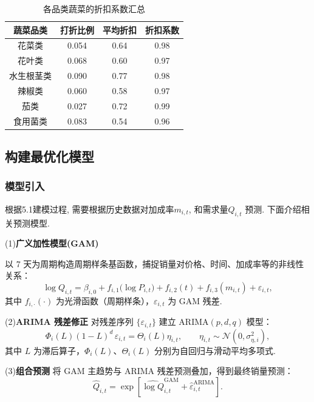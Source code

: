\documentclass{cumcmthesis}
\begin{document}
\begin{table}[H]
\centering
\begin{tabular}{cccc}
\hline
蔬菜品类 & 打折比例 & 平均折扣 & 折扣系数 \\
\hline
花菜类 & 0.054 & 0.64 &  0.98  \\
花叶类 & 0.068 & 0.60 &  0.97  \\
水生根茎类 & 0.090 & 0.77 & 0.98 \\
辣椒类 & 0.060 & 0.58 &  0.97 \\
茄类 & 0.027 & 0.72 &  0.99 \\
食用菌类 & 0.083 & 0.54 & 0.96  \\
\hline

\end{tabular}
\caption{各品类蔬菜的折扣系数汇总}
\label{tab:best_models}
\end{table}



\subsection{构建最优化模型}

\subsubsection{模型引入} 

根据5.1建模过程, 需要根据历史数据对加成率$m_{i,t}$, 和需求量$Q_{i,t}$
预测. 下面介绍相关预测模型.

(1)\textbf{广义加性模型(GAM)}

以 7 天为周期构造周期样条基函数，捕捉销量对价格、时间、加成率等的非线性关系：
\begin{equation}
\log Q_{i,t} = \beta_{i,0} 
+ f_{i,1}\bigl(\log P_{i,t}\bigr) 
+ f_{i,2}(t) 
+ f_{i,3}(m_{i,t}) 
+ \varepsilon_{i,t},
\label{eq:GAM}
\end{equation}
其中 $f_{i,\cdot}(\cdot)$ 为光滑函数（周期样条），$\varepsilon_{i,t}$ 为 GAM 残差.

(2)\textbf{ARIMA 残差修正}
对残差序列 $\{\varepsilon_{i,t}\}$ 建立 ARIMA$(p,d,q)$ 模型：
\begin{equation}
\Phi_i(L)(1-L)^d\,\varepsilon_{i,t} = \Theta_i(L)\eta_{i,t},
\qquad \eta_{i,t}\sim\mathcal{N}(0,\sigma_{\eta,i}^2),
\label{eq:ARIMA}
\end{equation}
其中 $L$ 为滞后算子，$\Phi_i(L)$、$\Theta_i(L)$ 分别为自回归与滑动平均多项式.

(3)\textbf{组合预测}
将 GAM 主趋势与 ARIMA 残差预测叠加，得到最终销量预测：
\begin{equation}
\widehat{Q}_{i,t} = \exp\!\left[\widehat{\log Q}_{i,t}^{\text{GAM}}
+ \widehat{\varepsilon}_{i,t}^{\text{ARIMA}}\right].
\label{eq:Qhat}
\end{equation}
\end{document}
